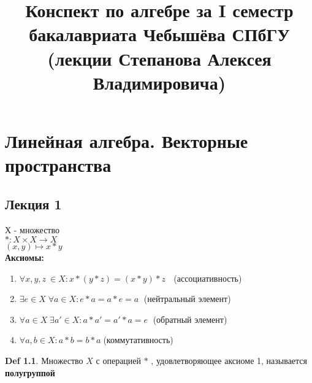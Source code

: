 \documentclass[12pt]{report}
\begin{document}
\renewcommand{\proofname}{Proof.}

\theoremstyle{plain}
\newtheorem{thm}{Theorem}[section]
\newtheorem*{lm}{Lemma}
\newtheorem*{st}{Statement}
\newtheorem*{prop}{Property}

\theoremstyle{definition}
\newtheorem{defn}{Def}
\newtheorem*{ex}{Ex}
\newtheorem*{exs}{Exs}
\newtheorem*{cor}{Corollary}
\newtheorem*{name}{Designation}

\theoremstyle{remark}
\newtheorem*{rem}{Remark}
\newtheorem*{com}{Comment}
\newtheorem*{note}{Note}
\newtheorem*{prac}{Practice}

\newcommand{\Z}{\mathbb{Z}}
\newcommand{\N}{\mathbb{N}}
\newcommand{\R}{\mathbb{R}}
\newcommand{\Q}{\mathbb{Q}}
\newcommand{\K}{\mathbb{K}}
\newcommand{\Cm}{\mathbb{C}}
\newcommand{\Pm}{\mathbb{P}}
\newcommand{\ilim}{\int\limits}
\newcommand{\slim}{\sum\limits}


\title{Конспект по алгебре за I семестр бакалавриата Чебышёва СПбГУ (лекции Степанова Алексея Владимировича)}                      
\maketitle
\clearpage
\tableofcontents
\clearpage
\chapter{Линейная алгебра. Векторные пространства}
\section{Лекция 1}
Х - множество\\
$ *: X \times X \to X$\\
$ (x, y) \mapsto x * y$\\
{\bf Аксиомы:}
\begin{enumerate}
    \item $\forall x,y,z \: \in X: x*(y*z) = (x*y)*z$ $\;$ (ассоциативность)
    \item $\exists e \in X \; \forall a \in X: e*a = a*e = a \;$ (нейтральный элемент)
    \item $\forall a \in X \; \exists a' \in X: a*a' = a' * a = e \;$ (обратный элемент)
    \item $\forall a, b \in X: a * b = b * a \; $(коммутативность)
\end{enumerate}

\begin{defn}
Множество $X$ с операцией $*$ , удовлетворяющее  аксиоме 1, называется {\bf полугруппой}
\end{defn}
\end{document}
